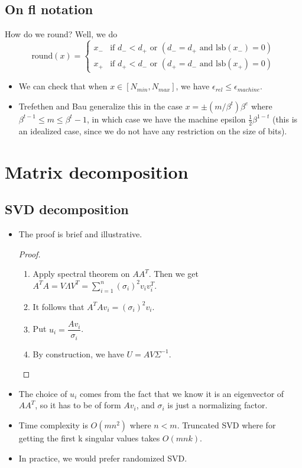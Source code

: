 \documentclass[11pt,reqno]{amsart}
\theoremstyle{remark}
\begin{document}
\subsection*{On fl notation}
How do we round? Well, we do
\[
\text{round}(x)=
\begin{cases} 
x_- & \text{if } d_- < d_+ \text{ or } (d_- = d_+ \text{ and } \text{lsb}(x_-) = 0) \\
x_+ & \text{if } d_+ < d_- \text{ or } (d_+ = d_- \text{ and } \text{lsb}(x_+) = 0)
\end{cases}
\]
\begin{itemize}
\item We can check that when $x\in [N_{min}, N_{max}]$, we have $\epsilon_{rel}\leq \epsilon_{machine}$.
\item Trefethen and Bau generalize this in the case $x=\pm (m/\beta^t)\beta^e$ where $\beta^{t-1}\leq m\leq \beta^t-1$, in which case we have the machine epsilon $\frac 12\beta^{1-t}$ (this is an idealized
 case, since we do not have any restriction on the size of bits).
\end{itemize}
\section{Matrix decomposition}
\subsection{SVD decomposition}
\begin{itemize}
\item The proof is brief and illustrative.
\begin{proof}
\begin{enumerate}
\item Apply spectral theorem on $AA^T$. Then we get $A^T A=V\Lambda V^T
=\sum\limits^n_{i=1}(\sigma_i)^2v_iv_i^T$.
\item It follows that $A^T Av_i=(\sigma_i)^2v_i$.
\item Put $u_i=\dfrac{Av_i}{\sigma_i}$.
\item By construction, we have $U=AV\Sigma^{-1}$.
\end{enumerate}
\end{proof}
\item The choice of $u_i$ comes from the fact that we know it is an 
eigenvector of $AA^T$, so it has to be of form $Av_i$, and $\sigma_i$ is just 
a normalizing factor.
\item Time complexity is $O(mn^2)$ where $n<m$. Truncated SVD where 
for getting the first k singular values takes $O(mnk)$.
\item In practice, we would prefer randomized SVD.
\end{itemize}
\end{document}
